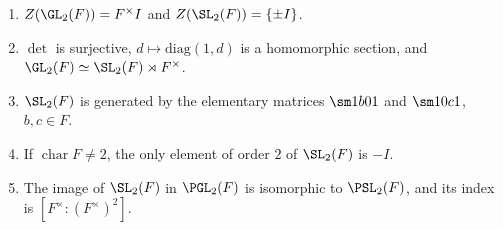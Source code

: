 \begin{proposition}\label{prop:groups:gl2}
\begin{enumerate}[label=(\roman*)]
\item $Z(\GL_2(F))=F^\times I$ and $Z(\SL_2(F))=\{\pm I\}$.
\item $\det$ is surjective, $d\mapsto\mathrm{diag}(1,d)$ is a homomorphic section, and $\GL_2(F)\simeq\SL_2(F)\rtimes F^\times$.
\item $\SL_2(F)$ is generated by the elementary matrices $\sm1b01$ and $\sm10c1$, $b,c\in F$.
\item If $\operatorname{char}F\ne2$, the only element of order $2$ of $\SL_2(F)$ is $-I$.
\item The image of $\SL_2(F)$ in $\PGL_2(F)$ is isomorphic to $\PSL_2(F)$, and its index is $[F^\times:(F^\times)^2]$.
\end{enumerate}
\end{proposition}

